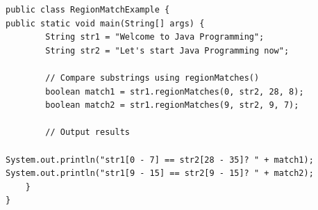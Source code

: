 \begin{verbatim}
public class RegionMatchExample {
public static void main(String[] args) {
        String str1 = "Welcome to Java Programming";
        String str2 = "Let's start Java Programming now";

        // Compare substrings using regionMatches()
        boolean match1 = str1.regionMatches(0, str2, 28, 8); 
        boolean match2 = str1.regionMatches(9, str2, 9, 7); 

        // Output results
        
System.out.println("str1[0 - 7] == str2[28 - 35]? " + match1);
System.out.println("str1[9 - 15] == str2[9 - 15]? " + match2);
    }
}
\end{verbatim}